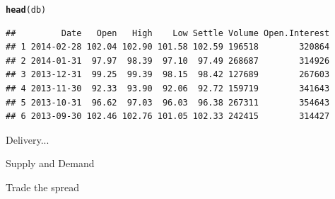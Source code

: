 \documentclass[12pt, a4paper, oneside]{article}\usepackage{graphicx, color}
\makeatletter
\newcommand{\hlfunctioncall}[1]{\textcolor[rgb]{0.501960784313725,0,0.329411764705882}{\textbf{#1}}}%
\newenvironment{kframe}{%
 \def\at@end@of@kframe{}%
 \ifinner\ifhmode%
  \def\at@end@of@kframe{\end{minipage}}%
  \begin{minipage}{\columnwidth}%
 \fi\fi%
 \def\FrameCommand##1{\hskip\@totalleftmargin \hskip-\fboxsep
 \colorbox{shadecolor}{##1}\hskip-\fboxsep
     \hskip-\linewidth \hskip-\@totalleftmargin \hskip\columnwidth}%
 \MakeFramed {\advance\hsize-\width
   \@totalleftmargin\z@ \linewidth\hsize
   \@setminipage}}%
 {\par\unskip\endMakeFramed%
 \at@end@of@kframe}
\newenvironment{knitrout}{}{} %
\makeatother
\begin{document}
\begin{knitrout}
\begin{kframe}
\begin{alltt}
\hlfunctioncall{head}(db)
\end{alltt}
\begin{verbatim}
##         Date   Open   High    Low Settle Volume Open.Interest
## 1 2014-02-28 102.04 102.90 101.58 102.59 196518        320864
## 2 2014-01-31  97.97  98.39  97.10  97.49 268687        314926
## 3 2013-12-31  99.25  99.39  98.15  98.42 127689        267603
## 4 2013-11-30  92.33  93.90  92.06  92.72 159719        341643
## 5 2013-10-31  96.62  97.03  96.03  96.38 267311        354643
## 6 2013-09-30 102.46 102.76 101.05 102.33 242415        314427
\end{verbatim}
\end{kframe}
\end{knitrout}


Delivery...

Supply and Demand

Trade the spread
\end{document}
